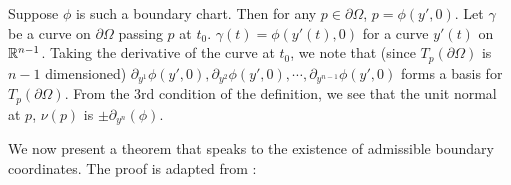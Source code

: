 \begin{remark}
    Suppose $\phi$ is such a boundary chart. Then for any $p\in \partial \Omega$, $p=\phi(y',0)$. Let $\gamma$ be a curve on $\partial \Omega$ passing $p$ at $t_0$. $\gamma(t)=\phi(y'(t),0)$ for a curve $y'(t)$ on $\mathbb{R}^{n-1}$. Taking the derivative of the curve at $t_0$, we note that (since $T_p(\partial \Omega)$ is $n-1$ dimensioned) $\partial_{y^1}\phi(y',0),\partial_{y^2}\phi(y',0),\cdots,\partial_{y^{n-1}}\phi(y',0)$ forms a basis for $T_p(\partial \Omega)$. From the 3rd condition of the definition, we see that the unit normal at $p$, $\nu(p)$ is $\pm\partial_{y^n}(\phi)$.
\end{remark}
We now present a theorem that speaks to the existence of admissible boundary coordinates. The proof is adapted from \cite{CsatoDacorognaKneuss2012}:
